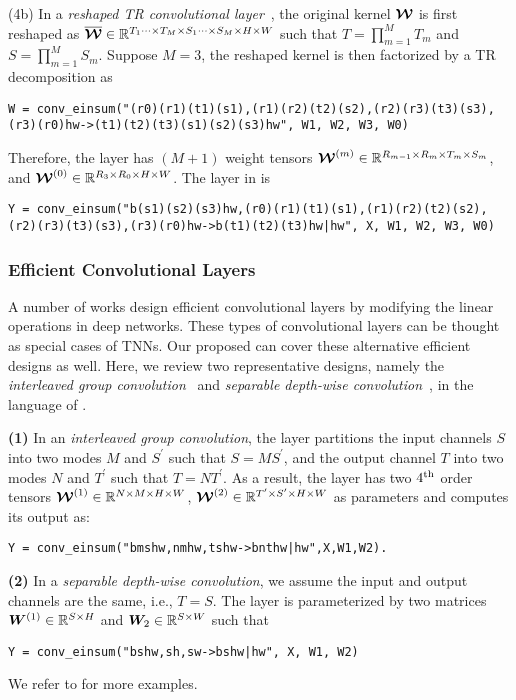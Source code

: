 (4b) In a {\em reshaped TR convolutional layer}~\citep{su2018tensorial}, the original kernel $\bm{\mathcal{W}}$ is first reshaped as $\bm{\mathcal{\overline{W}}} \in \mathbb{R}^{T_1 \cdots \times T_M \times S_1 \cdots \times S_M \times H \times W}$ such that $T = \prod_{m = 1}^{M} T_m$ and $S = \prod_{m = 1}^{M} S_m$. Suppose $M = 3$, the reshaped kernel is then factorized by a TR decomposition as
\begin{lstlisting}
W = conv_einsum("(r0)(r1)(t1)(s1),(r1)(r2)(t2)(s2),(r2)(r3)(t3)(s3),(r3)(r0)hw->(t1)(t2)(t3)(s1)(s2)(s3)hw", W1, W2, W3, W0)
\end{lstlisting}
\vspace{-0.5em}
Therefore, the layer has $(M + 1)$ weight tensors $\bm{\mathcal{W}}^{(m)} \in \mathbb{R}^{R_{m - 1} \times R_m \times T_m \times S_m}$, and $\bm{\mathcal{W}}^{(0)} \in \mathbb{R}^{R_3 \times R_0 \times H \times W}$. The layer in \conveinsum is
\begin{lstlisting}
Y = conv_einsum("b(s1)(s2)(s3)hw,(r0)(r1)(t1)(s1),(r1)(r2)(t2)(s2),(r2)(r3)(t3)(s3),(r3)(r0)hw->b(t1)(t2)(t3)hw|hw", X, W1, W2, W3, W0)
\end{lstlisting}

\subsubsection{Efficient Convolutional Layers} \label{app:efficientNN}
A number of works design efficient convolutional layers by modifying the linear operations in deep networks. These types of convolutional layers can be thought as special cases of TNNs. 
Our proposed \conveinsum can cover these alternative efficient designs as well. 
Here, we review two representative designs, namely the {\em interleaved group convolution}~\citep{zhang2017interleaved} and {\em separable depth-wise convolution}~\citep{chollet2017xception}, in the language of \conveinsum.

{\bf (1)} In an {\em interleaved group convolution}, the layer partitions the input channels $S$ into two modes $M$ and $S^\prime$ such that $S = M S^\prime$, and the output channel $T$ into two modes $N$ and  $T^\prime$ such that $T = N T^\prime$.
As a result, the layer has two $4^{\mathrm{th}}$ order tensors $\bm{\mathcal{W}}^{(1)} \in \mathbb{R}^{N \times M \times H \times W}$, $\bm{\mathcal{W}}^{(2)} \in \mathbb{R}^{T^\prime \times S^\prime \times H \times W}$ as parameters and computes its output as:
\begin{lstlisting}
Y = conv_einsum("bmshw,nmhw,tshw->bnthw|hw",X,W1,W2).
\end{lstlisting}
\vspace{-1em}
{\bf (2)} In a {\em separable depth-wise convolution}, we assume the input and output channels are the same, i.e., $T = S$. 
The layer is parameterized by two matrices $\bm{W}^{(1)} \in \mathbb{R}^{S \times H}$ and $\bm{W}_2 \in \mathbb{R}^{S \times W}$ such that
\begin{lstlisting}
Y = conv_einsum("bshw,sh,sw->bshw|hw", X, W1, W2)
\end{lstlisting}
\vspace{-1em}
We refer to \citet{hayashi2019exploring} for more examples.
